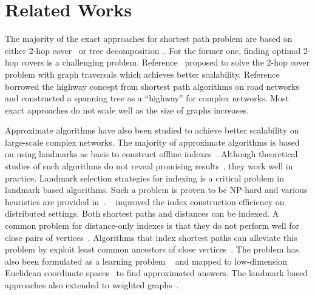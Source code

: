 \section{Related Works}
\label{relatedwork} 

The majority of the exact approaches for shortest path problem are based on either 2-hop cover~\cite{Cohen:2002:RDQ:545381.545503,Akiba:2013:FES:2463676.2465315} or tree decomposition~\cite{Akiba:2012:SQC:2247596.2247614,Wei:2010:TES:1807167.1807181}. For the former one, finding optimal 2-hop covers is a challenging problem. Reference~\cite{Akiba:2013:FES:2463676.2465315} proposed to solve the 2-hop cover problem with graph traversals which achieves better scalability. 
Reference~\cite{Jin:2012:HLA:2213836.2213887} borrowed the highway concept from shortest path algorithms on road networks and constructed a spanning tree as a ``highway'' for complex networks. %
Most exact approaches do not scale well as the size of graphs increases.

Approximate algorithms have also been studied to achieve better scalability on large-scale complex networks. The majority of approximate algorithms is based on using landmarks as basis to construct offline indexes~\cite{Thorup:2005:ADO:1044731.1044732,Goldberg:2005:CSP:1070432.1070455,Potamias:2009:FSP:1645953.1646063,floreskul2014memory,Maier:2011:INS:1993077.1993079, das2010sketch, qi2013toward}. Although theoretical studies of such algorithms do not reveal promising results~\cite{Thorup:2005:ADO:1044731.1044732}, they work well in practice. Landmark selection strategies for indexing is a critical problem in landmark based algorithms. Such a problem is proven to be NP-hard and various heuristics are provided in~\cite{Potamias:2009:FSP:1645953.1646063,6927522}. ~\cite{qi2013toward} improved the index construction efficiency on distributed settings. Both shortest paths and distances can be indexed. A common problem for distance-only indexes is that they do not perform well for close pairs of vertices~\cite{Akiba:2012:SQC:2247596.2247614}. Algorithms that index shortest paths can alleviate this problem by exploit least common ancestors of close vertices~\cite{Gubichev:2010:FAE:1871437.1871503,tretyakov2011fast,6399472}. The problem has also been formulated as a learning problem ~\cite{7004250} and mapped to low-dimension Euclidean coordinate spaces~\cite{Zhao:2010:OSP:1863190.1863199} to find approximated answers. The landmark based approaches also extended to weighted graphs~\cite{yang2012finding}.

